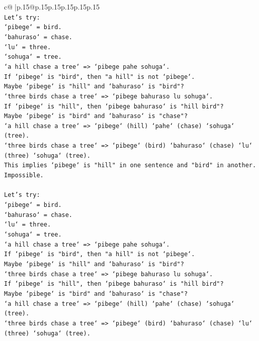 \documentclass{article}
\begin{document}
{\begin{supertabular}{c@{$\;$}|p{.15\linewidth}@{}p{.15\linewidth}p{.15\linewidth}p{.15\linewidth}p{.15\linewidth}p{.15\linewidth}}
{{{\\ 
\texttt{Let's try:} \\
\texttt{`pibege` = bird.} \\
\texttt{`bahuraso` = chase.} \\
\texttt{`lu` = three.} \\
\texttt{`sohuga` = tree.} \\
\texttt{`a hill chase a tree` => `pibege pahe sohuga`.} \\
\texttt{If `pibege` is "bird", then "a hill" is not `pibege`.} \\
\texttt{Maybe `pibege` is "hill" and `bahuraso` is "bird"?} \\
\texttt{`three birds chase a tree` => `pibege bahuraso lu sohuga`.} \\
\texttt{If `pibege` is "hill", then `pibege bahuraso` is "hill bird"?} \\
\texttt{Maybe `pibege` is "bird" and `bahuraso` is "chase"?} \\
\texttt{`a hill chase a tree` => `pibege` (hill) `pahe` (chase) `sohuga` (tree).} \\
\texttt{`three birds chase a tree` => `pibege` (bird) `bahuraso` (chase) `lu` (three) `sohuga` (tree).} \\
\texttt{This implies `pibege` is "hill" in one sentence and "bird" in another. Impossible.} \\
\\ 
\texttt{Let's try:} \\
\texttt{`pibege` = bird.} \\
\texttt{`bahuraso` = chase.} \\
\texttt{`lu` = three.} \\
\texttt{`sohuga` = tree.} \\
\texttt{`a hill chase a tree` => `pibege pahe sohuga`.} \\
\texttt{If `pibege` is "bird", then "a hill" is not `pibege`.} \\
\texttt{Maybe `pibege` is "hill" and `bahuraso` is "bird"?} \\
\texttt{`three birds chase a tree` => `pibege bahuraso lu sohuga`.} \\
\texttt{If `pibege` is "hill", then `pibege bahuraso` is "hill bird"?} \\
\texttt{Maybe `pibege` is "bird" and `bahuraso` is "chase"?} \\
\texttt{`a hill chase a tree` => `pibege` (hill) `pahe` (chase) `sohuga` (tree).} \\
\texttt{`three birds chase a tree` => `pibege` (bird) `bahuraso` (chase) `lu` (three) `sohuga` (tree).} \\
}}}
\end{supertabular}}
\end{document}

